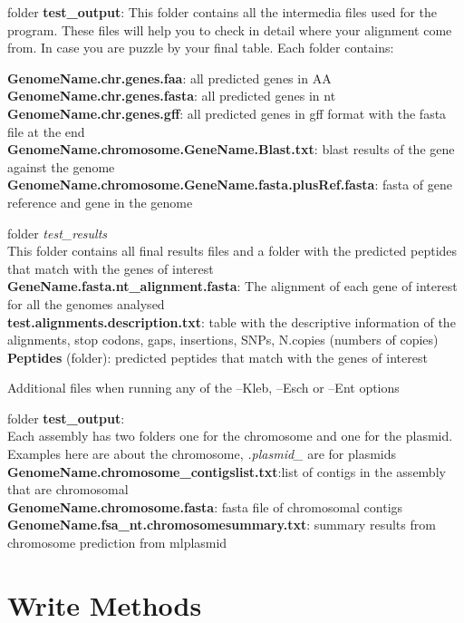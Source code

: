 \documentclass[
]{book}
\begin{document}
folder \textbf{test\_output}:
This folder contains all the intermedia files used for the program. These files will help you to check in detail where your alignment come from. In case you are puzzle by your final table. Each folder contains:

\textbf{GenomeName.chr.genes.faa}: all predicted genes in AA\\
\textbf{GenomeName.chr.genes.fasta}: all predicted genes in nt\\
\textbf{GenomeName.chr.genes.gff}: all predicted genes in gff format with the fasta file at the end\\
\textbf{GenomeName.chromosome.GeneName.Blast.txt}: blast results of the gene against the genome\\
\textbf{GenomeName.chromosome.GeneName.fasta.plusRef.fasta}: fasta of gene reference and gene in the genome

folder \emph{test\_results}\\
This folder contains all final results files and a folder with the predicted peptides that match with the genes of interest\\
\textbf{GeneName.fasta.nt\_alignment.fasta}: The alignment of each gene of interest for all the genomes analysed\\
\textbf{test.alignments.description.txt}: table with the descriptive information of the alignments, stop codons, gaps, insertions, SNPs, N.copies (numbers of copies)\\
\textbf{Peptides} (folder): predicted peptides that match with the genes of interest

Additional files when running any of the --Kleb, --Esch or --Ent options

folder \textbf{test\_output}:\\
Each assembly has two folders one for the chromosome and one for the plasmid. Examples here are about the chromosome, \emph{.plasmid\_} are for plasmids\\
\textbf{GenomeName.chromosome\_contigslist.txt}:list of contigs in the assembly that are chromosomal\\
\textbf{GenomeName.chromosome.fasta}: fasta file of chromosomal contigs\\
\textbf{GenomeName.fsa\_nt.chromosomesummary.txt}: summary results from chromosome prediction from mlplasmid

\hypertarget{write-methods}{%
\chapter{Write Methods}\label{write-methods}}
\end{document}

